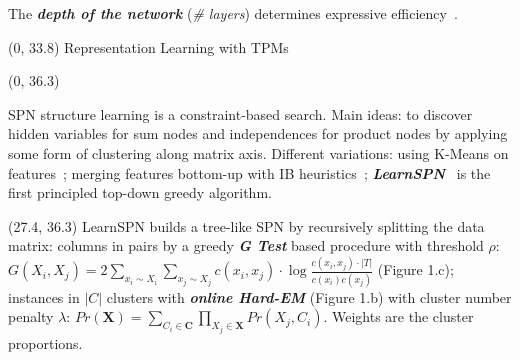 \documentclass[final]{beamer}
\begin{document}
\begin{frame}{}
\begin{textblock}{25.2}
  The \emph{\textbf{depth of the network}} (\emph{\# layers})
  determines expressive efficiency~\parencite{Martens2014}.
  
  \end{textblock}
  
  \begin{textblock}{80}(0, 33.8)
    Representation Learning with TPMs
  \end{textblock}
  
  \begin{textblock}{25.2}(0, 36.3)
    \footnotesize
     
    SPN structure learning is a constraint-based
    search. Main ideas: to discover hidden variables for sum nodes and independences
    for product nodes by applying some form of clustering
    along matrix axis. Different variations:
    using K-Means on
    features~\emph{\parencite{Dennis2012}}; merging features bottom-up
    with IB heuristics\emph{~\parencite{Peharz2013}};
    \emph{\textbf{LearnSPN}}~\emph{\parencite{Gens2013}} is the first principled top-down greedy
    algorithm. 
    

      

      
  \end{textblock}
  
  \begin{textblock}{25.2}(27.4, 36.3)
    \footnotesize
    LearnSPN builds a tree-like SPN by recursively splitting the data
    matrix: columns in pairs by a greedy \textbf{\emph{G Test}} based
    procedure with threshold $\rho$: $G(X_i, X_j) =  2\sum_{x_i \sim
      X_i}\sum_{x_j \sim X_j}c(x_i, x_j)\cdot \log\frac{c(x_i,
      x_j)\cdot |T|}{c(x_i)c(x_j)}$ (Figure 1.c); instances in
    $|C|$ clusters with \textbf{\emph{online Hard-EM}} (Figure 1.b) with cluster number penalty
    $\lambda$: $Pr(\mathbf{X})= \sum_{C_i \in \mathbf{C}}\prod_{X_j
      \in \mathbf{X}}Pr(X_j,C_i)$. Weights are the cluster proportions.
    

\end{textblock}
\end{frame}
\end{document}
